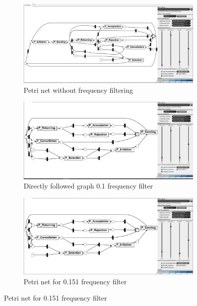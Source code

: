 \begin{figure}[!htbp]
\centering
\begin{subfigure}{.4\textwidth}
  \centering
  \includegraphics[width=\linewidth]{P_DirectlyFollowedFreq0.PNG}
  \caption{Petri net without frequency filtering}
  \label{fig:P_DFG0}
\end{subfigure}%
\begin{subfigure}{.4\textwidth}
  \centering
  \includegraphics[width=\linewidth]{P_DirectlyFollowedFreq0-1.PNG}
  \caption{Directly followed graph 0.1 frequency filter}
  \label{fig:P_DFG0-1}
\end{subfigure}
\begin{subfigure}{.4\textwidth}
  \centering
  \includegraphics[width=\linewidth]{P_DirectlyFollowedFreq0-151.PNG}
  \caption{Petri net for 0.151 frequency filter}

\end{subfigure}
\end{figure}
